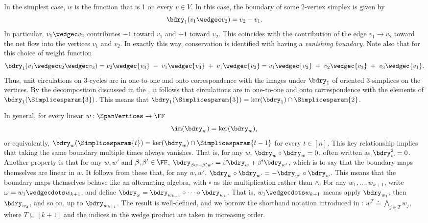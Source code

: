 \documentclass{toc}
\begin{document}
In the simplest case, \(w\) is the function that is 1 on every $v \in V$.
In this case, the boundary of some 2-vertex simplex is given by
\[
  \bdry_1( v_1 \wedgec v_2 ) = v_2 - v_1.
\]
In particular, \(v_1 \wedgec v_2\) contributes \(-1\) toward \(v_1\)
and \(+1\) toward \(v_2\).
This coincides with the contribution of the edge \(v_1\to v_2\) toward the
net flow into the vertices \(v_1\) and \(v_2\).
In exactly this way, conservation is identified with having a
\emph{vanishing boundary}. Note also that for this choice of weight function
\[ \bdry_1(v_1 \wedgec v_2 \wedgec v_3)
= {v_2}\wedgec {v_3} \;-\; {v_1}\wedgec {v_3} \;+\; {v_1}\wedgec {v_2} = {v_1}\wedgec {v_2} \;+\; {v_2}\wedgec {v_3} \;+\; {v_3}\wedgec {v_1}.\]
Thus, unit circulations on 3-cycles are in one-to-one and onto correspondence with the images under $\bdry_1$ of oriented 3-simplices on the vertices. By the decomposition discussed in the  
, it follows that circulations are in one-to-one and onto correspondence with the elements of $\bdry_1(\Simplicesparam{3})$. This means that $\bdry_1(\Simplicesparam{3}) = \ker(\bdry_1) \cap \Simplicesparam{2}$.

In general, for every linear $w: \SpanVertices \to \FF$
\begin{equation}\label{eq.key}
\im(\bdry_w) = \ker(\bdry_w),
\end{equation}
or equivalently, 
$\bdry_w(\Simplicesparam{t}) = \ker(\bdry_w) \cap \Simplicesparam{t-1}$ for every $t \in [n]$.
This key relationship implies that taking the same boundary multiple times always vanishes.
That is, for any \(w\), \(\bdry_w \circ \bdry_w = 0\), often written as $\bdry_w^2 = 0$.
Another property is that for any \(w, w'\) and \(\beta,\beta'\in\FF\),
\(\bdry_{\beta w + \beta'w'} = \beta\bdry_w + \beta'\bdry_{w'}\),
which is to say that the boundary maps themselves are linear in \(w\).
It follows from these that, for any \(w,w'\), \(\bdry_w \circ \bdry_{w'} =
-\bdry_{w'}\circ \bdry_w\).
This means that the boundary maps themselves behave like an
alternating algebra, with \(\circ\) as the multiplication rather than
\(\wedge\).
For any \(w_1,\ldots,w_{k+1}\), write \(\omega = w_1\wedgecdots w_{k+1}\),
and define
\(\bdry_\omega = \bdry_{w_{k+1}} \circ \cdots \circ \bdry_{w_1}\).
That is, \(w_1\wedgecdots w_{k+1}\) means apply \(\bdry_{w_1}\),
then \(\bdry_{w_2}\), and so on, up to \(\bdry_{w_{k+1}}\).
The result is well-defined, and we borrow the shorthand notation introduced in : $w^T \doteq \bigwedge_{j\in T} w_j$, where $T \subseteq [k+1]$ and the indices in the wedge product are taken in increasing order.
\end{document}
